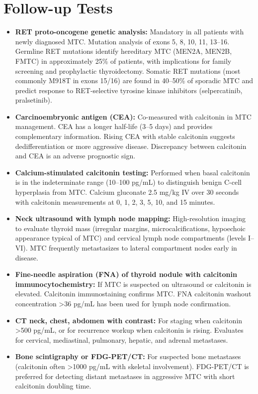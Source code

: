 \section*{Follow-up Tests}
\begin{itemize}
  \item \textbf{RET proto-oncogene genetic analysis:} Mandatory in all patients with newly diagnosed MTC. Mutation analysis of exons 5, 8, 10, 11, 13--16. Germline RET mutations identify hereditary MTC (MEN2A, MEN2B, FMTC) in approximately 25\% of patients, with implications for family screening and prophylactic thyroidectomy. Somatic RET mutations (most commonly M918T in exons 15/16) are found in 40--50\% of sporadic MTC and predict response to RET-selective tyrosine kinase inhibitors (selpercatinib, pralsetinib).
  \item \textbf{Carcinoembryonic antigen (CEA):} Co-measured with calcitonin in MTC management. CEA has a longer half-life (3--5 days) and provides complementary information. Rising CEA with stable calcitonin suggests dedifferentiation or more aggressive disease. Discrepancy between calcitonin and CEA is an adverse prognostic sign.
  \item \textbf{Calcium-stimulated calcitonin testing:} Performed when basal calcitonin is in the indeterminate range (10--100 pg/mL) to distinguish benign C-cell hyperplasia from MTC. Calcium gluconate 2.5 mg/kg IV over 30 seconds with calcitonin measurements at 0, 1, 2, 3, 5, 10, and 15 minutes.
  \item \textbf{Neck ultrasound with lymph node mapping:} High-resolution imaging to evaluate thyroid mass (irregular margins, microcalcifications, hypoechoic appearance typical of MTC) and cervical lymph node compartments (levels I--VI). MTC frequently metastasizes to lateral compartment nodes early in disease.
  \item \textbf{Fine-needle aspiration (FNA) of thyroid nodule with calcitonin immunocytochemistry:} If MTC is suspected on ultrasound or calcitonin is elevated. Calcitonin immunostaining confirms MTC. FNA calcitonin washout concentration >36 pg/mL has been used for lymph node confirmation.
  \item \textbf{CT neck, chest, abdomen with contrast:} For staging when calcitonin >500 pg/mL, or for recurrence workup when calcitonin is rising. Evaluates for cervical, mediastinal, pulmonary, hepatic, and adrenal metastases.
  \item \textbf{Bone scintigraphy or FDG-PET/CT:} For suspected bone metastases (calcitonin often >1000 pg/mL with skeletal involvement). FDG-PET/CT is preferred for detecting distant metastases in aggressive MTC with short calcitonin doubling time.

\end{itemize}
